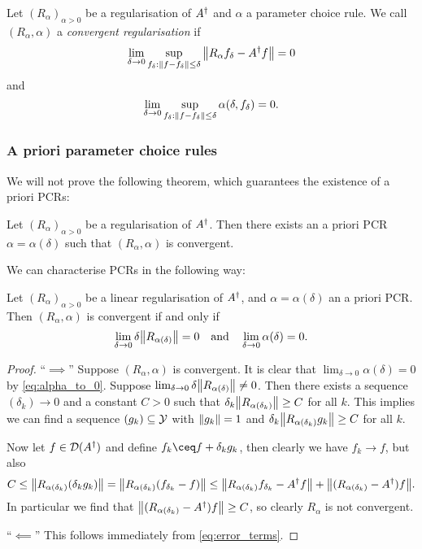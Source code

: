 \begin{definition}
	Let $(R_\alpha)_{\alpha > 0}$ be a regularisation of $A^\dagger$ and $\alpha$ a parameter choice rule. We call $(R_\alpha, \alpha)$ a \emph{convergent regularisation} if
	\[
	\lim_{\delta \to 0} \sup_{f_\delta : \norm{f - f_\delta} \leq \delta} \norm{R_\alpha f_\delta - A^\dagger f} = 0
	\]
	and
	\begin{equation} \label{eq:alpha_to_0}
	\lim_{\delta \to 0} \sup_{f_\delta : \norm{f - f_\delta} \leq \delta} \alpha(\delta, f_\delta) = 0. 
	\end{equation}
\end{definition}

\subsubsection{A priori parameter choice rules}

We will not prove the following theorem, which guarantees the existence of a priori PCRs: 
\begin{theorem}
	Let $(R_\alpha)_{\alpha > 0}$ be a regularisation of $A^\dagger$. Then there exists an a priori PCR $\alpha = \alpha(\delta)$ such that $(R_\alpha, \alpha)$ is convergent. 
\end{theorem}

We can characterise PCRs in the following way:
\begin{theorem}
	Let $(R_\alpha)_{\alpha > 0}$ be a linear regularisation of $A^\dagger$, and $\alpha = \alpha(\delta)$ an a priori PCR. Then $(R_\alpha, \alpha)$ is convergent if and only if
	\[
	\lim_{\delta \to 0} \delta \norm{R_{\alpha(\delta)}} = 0 \quad\text{and}\quad \lim_{\delta\to 0} \alpha(\delta) = 0. 
	\]
\end{theorem}

\begin{proof}
	``$\implies$'' Suppose $(R_\alpha, \alpha)$ is convergent. It is clear that $\lim_{\delta \to 0} \alpha(\delta) = 0$ by \cref{eq:alpha_to_0}. Suppose $\lim_{\delta\to 0} \delta \norm{R_{\alpha(\delta)}} \neq 0$. Then there exists a sequence $(\delta_k) \to 0$ and a constant $C > 0$ such that $\delta_k \norm{R_{\alpha(\delta_k)}} \geq C$ for all $k$. This implies we can find a sequence $(g_k) \subseteq \mathcal Y$ with $\norm{g_k} = 1$ and $\delta_k \norm{R_{\alpha(\delta_k)}g_k} \geq C$ for all $k$. 
	
	Now let $f \in \operatorname{\mathcal D}(A^\dagger)$ and define $f_k \ceq f + \delta_k g_k$, then clearly we have $f_k \to f$, but also
	\[
	C \leq \norm{R_{\alpha(\delta_k)}(\delta_k g_k)} = \norm{R_{\alpha(\delta_k)}(f_{\delta_k} - f)} \leq \norm{R_{\alpha(\delta_k)}f_{\delta_k} - A^\dagger f} + \norm{(R_{\alpha(\delta_k)} - A^\dagger) f}.
	\]
	In particular we find that $\norm{(R_{\alpha(\delta_k)} - A^\dagger) f} \geq C$, so clearly $R_\alpha$ is not convergent. 
	
	``$\impliedby$'' This follows immediately from \cref{eq:error_terms}. 
\end{proof}

